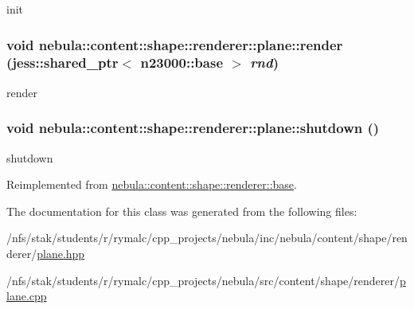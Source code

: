 init \hypertarget{classnebula_1_1content_1_1shape_1_1renderer_1_1plane_ac47d793f33f2b37ffd386c06bcc4cc53}{
\subsubsection[{render}]{\setlength{\rightskip}{0pt plus 5cm}void nebula::content::shape::renderer::plane::render (jess::shared\_\-ptr$<$ {\bf n23000::base} $>$ {\em rnd})}}
\label{classnebula_1_1content_1_1shape_1_1renderer_1_1plane_ac47d793f33f2b37ffd386c06bcc4cc53}


render \hypertarget{classnebula_1_1content_1_1shape_1_1renderer_1_1plane_ae5a310f6e36f4798770fae0aec97d20c}{
\subsubsection[{shutdown}]{\setlength{\rightskip}{0pt plus 5cm}void nebula::content::shape::renderer::plane::shutdown ()}}
\label{classnebula_1_1content_1_1shape_1_1renderer_1_1plane_ae5a310f6e36f4798770fae0aec97d20c}


shutdown 

Reimplemented from \hyperlink{classnebula_1_1content_1_1shape_1_1renderer_1_1base_a3e5311f8c103a0ae28e20c4145737cf8}{nebula::content::shape::renderer::base}.

The documentation for this class was generated from the following files:\begin{DoxyCompactItemize}
\item 
/nfs/stak/students/r/rymalc/cpp\_\-projects/nebula/inc/nebula/content/shape/renderer/\hyperlink{renderer_2plane_8hpp}{plane.hpp}\item 
/nfs/stak/students/r/rymalc/cpp\_\-projects/nebula/src/content/shape/renderer/\hyperlink{renderer_2plane_8cpp}{plane.cpp}\end{DoxyCompactItemize}
